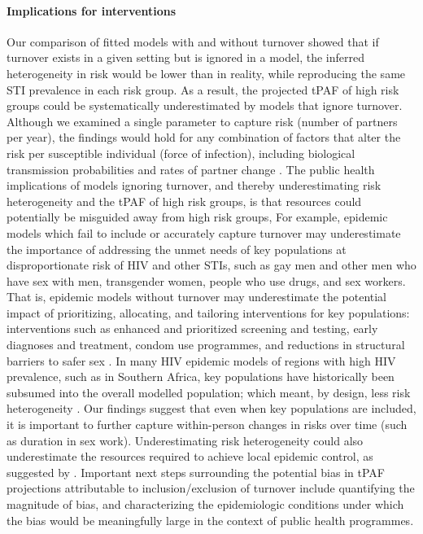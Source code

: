 \paragraph{Implications for interventions}
Our comparison of fitted models with and without turnover showed that
if turnover exists in a given setting but is ignored in a model,
the inferred heterogeneity in risk would be lower than in reality,
while reproducing the same STI prevalence in each risk group.
As a result, the projected tPAF of high risk groups
could be systematically underestimated by models that ignore turnover.
Although we examined a single parameter to capture risk
(number of partners per year),
the findings would hold for any combination of factors
that alter the risk per susceptible individual (force of infection), including
biological transmission probabilities and rates of partner change \citep{Anderson1991}.
The public health implications of models ignoring turnover,
and thereby underestimating risk heterogeneity and the tPAF of high risk groups,
is that resources could potentially be misguided away from high risk groups,
For example, epidemic models which fail to include or accurately capture
turnover may underestimate the importance of addressing the unmet
needs of key populations at disproportionate risk of HIV and other STIs, such as
gay men and other men who have sex with men, transgender women, people who use drugs, and sex workers.
That is, epidemic models without turnover may underestimate the potential impact 
of prioritizing, allocating, and tailoring interventions for key populations: interventions such as
enhanced and prioritized screening and testing, early diagnoses and treatment,
condom use programmes, and reductions in structural barriers to safer sex \citep{WHO2016}.
In many HIV epidemic models of regions with high HIV prevalence, such as in Southern Africa,
key populations have historically been subsumed into the overall modelled population;
which meant, by design, less risk heterogeneity \citep{Eaton2012,Cori2014,Mishra2016}.
Our findings suggest that even when key populations are included, it is important to
further capture within-person changes in risks over time (such as duration in sex work).
Underestimating risk heterogeneity could also underestimate the resources
required to achieve local epidemic control, as suggested by \citet{Henry2015,Hontelez2013}.
Important next steps surrounding the potential bias in tPAF projections
attributable to inclusion/exclusion of turnover include
quantifying the magnitude of bias,
and characterizing the epidemiologic conditions under which the bias
would be meaningfully large in the context of public health programmes.
